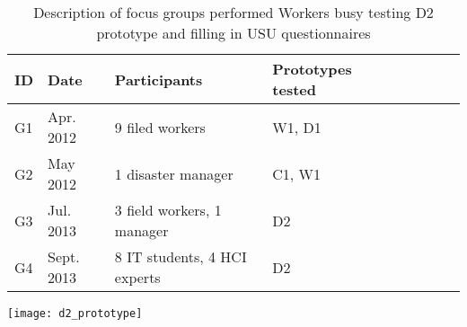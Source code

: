 \documentclass{article}[10pt]
\begin{document}
	\begin{table}[h]
		  \begin{threeparttable}
	\begin{tabular}{@{}lllllllll@{}}	
	\toprule
	ID  & Date        & Participants      & Prototypes tested \\
	\midrule
	G1  & Apr. 2012  & 9 filed workers     & W1, D1 \\
	G2  & May 2012   & 1 disaster manager  & C1, W1 \\
	G3  & Jul. 2013  & 3 field workers, 1 manager & D2 \\
	G4  & Sept. 2013 & 8 IT students, 4 HCI experts & D2 \\
	\bottomrule
	\end{tabular}
	\begin{tablenotes}
	     \item
	    \texttt{[image: d2\_prototype]}
	   \end{tablenotes}
	 \end{threeparttable}
	\caption{Description of focus groups performed  Workers busy testing D2 prototype and filling in USU questionnaires}
	\label{prototypes}
	\end{table}
\end{document}

